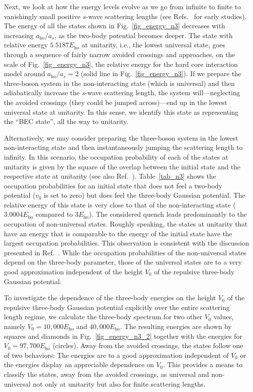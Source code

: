 \documentclass[aps,pra,twocolumn,showpacs,superscriptaddress]{revtex4}
\begin{document}
Next, we look at how the energy levels 
evolve as we go from
infinite
to finite to vanishingly small positive
$s$-wave scattering lengths (see 
Refs.~\cite{blume2002,jonsell2002} for early studies).
The energy of all the states shown in Fig.~\ref{fig_energy_n3}
decreases with increasing $a_{\text{ho}}/a_s$,
as the two-body potential becomes deeper.
The state with relative energy $5.5187 E_{\text{ho}}$
at unitarity, i.e., the lowest universal state,
goes through a sequence of 
fairly narrow avoided crossings and
approaches, on the scale of Fig.~\ref{fig_energy_n3}, 
the relative energy for the hard core interaction
model around $a_{\text{ho}}/a_s=2$
(solid line in Fig.~\ref{fig_energy_n3}).
If we prepare the three-boson system
in the 
non-interacting state (which is universal) and then adiabatically
increase the $s$-wave scattering length,
the system will---neglecting the avoided crossings
(they could be jumped across)---end up in the lowest 
universal state at unitarity.
In this sense, we identify this state as 
representing the ``BEC state'', all
the way to unitarity.


Alternatively, we may consider
preparing the three-boson system
in the
lowest
non-interacting state and then instantaneously jumping the
scattering length to infinity.
In this scenario, the occupation probability
of each of the states at unitarity is given by the square of the 
overlap between the initial state and the respective state at
unitarity (see also Ref.~\cite{sykes2014}). 
Table~\ref{tab_n3} shows the occupation probabilities
for an initial state that does not feel a two-body
potential ($v_0$ is set to zero)
but does feel the three-body Gaussian potential.
The relative energy of this state is very close
to that of the non-interacting
state ($3.0004  E_{\text{ho}}$ compared to $3 E_{\text{ho}}$).
The considered quench leads predominantly
to the occupation of non-universal states.
Roughly speaking, the states at unitarity that have an energy
that is comparable to the energy of the initial
state have the largest occupation probabilities.
This observation is consistent with the discussion
presented in Ref.~\cite{sykes2014}. While the occupation
probabilities of the non-universal states  depend on the
three-body parameter, those of the universal states are 
to a very good approximation independent of the
height $V_0$ of the repulsive three-body
Gaussian potential. 

To investigate the dependence of the three-body energies
on the height $V_0$
of the repulsive three-body Gaussian potential explicitly
over the entire scattering length regime, we 
calculate the three-body spectrum for two other $V_0$ values,
namely $V_0=10,000 E_{\text{ho}}$ and $40,000 E_{\text{ho}}$.
The resulting energies are shown 
by squares and diamonds in Fig.~\ref{fig_energy_n3_2}
together with the energies for $V_0=97,700E_{\text{ho}}$
(circles).
Away from the avoided crossings, the states follow one of
two behaviors:
The energies are to a good approximation independent of
$V_0$ or the energies 
display an appreciable dependence on $V_0$.
This provides a means to classify the states,
away from the avoided crossings, as universal and 
non-universal not only at unitarity but also
for finite scattering lengths.
\end{document}

